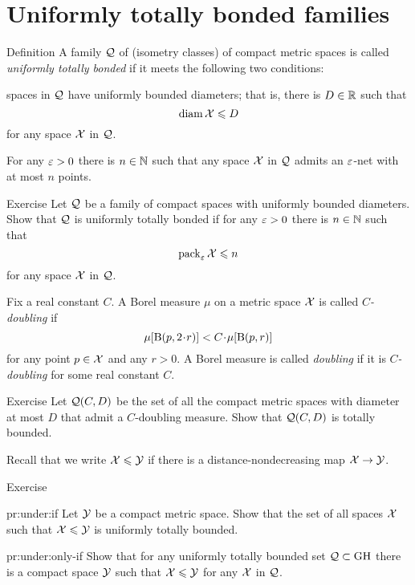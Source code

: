 \section{Uniformly totally bonded families}

\begin{thm}{Definition}\label{def:utb}
A family $\mathcal{Q}$ of (isometry classes) of compact metric spaces is called  \emph{uniformly totally bonded} if it meets the following two conditions:

\begin{subthm}{}
spaces in $\mathcal{Q}$ have uniformly bounded diameters; that is, there is $D\in\mathbb{R}$ such that
\[\operatorname{\rm diam}\nolimits\mathcal{X}\leqslant D\]
for any space $\mathcal{X}$ in $\mathcal{Q}$.
\end{subthm}

\begin{subthm}{}
For any $\varepsilon>0$ there is $n\in\mathbb{N}$ such that any space $\mathcal{X}$ in $\mathcal{Q}$ admits an $\varepsilon$-net with at most $n$ points.
\end{subthm}
\end{thm}

\begin{thm}{Exercise}\label{ex:utb+pack}
Let $\mathcal{Q}$ be a family of compact spaces with uniformly bounded diameters.
Show that $\mathcal{Q}$ is uniformly totally bonded if for any $\varepsilon>0$ there is $n\in\mathbb{N}$ such that 
\[\operatorname{\rm pack}\nolimits_\varepsilon\mathcal{X}\leqslant n\]
for any space $\mathcal{X}$ in $\mathcal{Q}$.
\end{thm}


Fix a real constant $C$.
A Borel measure $\mu$ on a metric space $\mathcal{X}$ is called \emph{$C$-doubling} if
\[\mu[\oBall(p,2\cdot r)]< C\cdot\mu[\oBall(p,r)]\]
for any point $p\in \mathcal{X}$ and any $r>0$.
A Borel measure is called \emph{doubling} if it is {}\emph{$C$-doubling} for some real constant $C$.

\begin{thm}{Exercise}\label{pr:doubling}
Let $\mathcal{Q}(C,D)$ be the set of all the compact metric spaces with diameter at most $D$ that admit a $C$-doubling measure.
Show that $\mathcal{Q}(C,D)$ is totally bounded.
\end{thm}

Recall that we write $\mathcal{X}\leqslant\mathcal{Y}$ if there is a distance-nondecreasing map $\mathcal{X}\to\mathcal{Y}$.

\begin{thm}{Exercise}\label{pr:under}

\begin{subthm}{pr:under:if}
Let $\mathcal{Y}$ be a compact metric space.
Show that the set of all spaces $\mathcal{X}$ such that $\mathcal{X}\leqslant\mathcal{Y}$
is uniformly totally bounded.
\end{subthm}

\begin{subthm}{pr:under:only-if}
Show that for any uniformly totally bounded set $\mathcal{Q}\subset\operatorname{\rm GH}\nolimits$ there is a compact space $\mathcal{Y}$
such that $\mathcal{X}\leqslant\mathcal{Y}$ for any $\mathcal{X}$ in $\mathcal{Q}$.
\end{subthm}

\end{thm}

